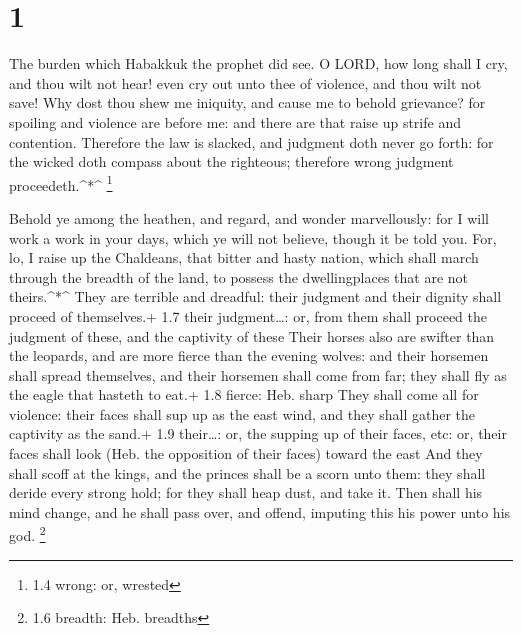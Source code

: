 \hypertarget{section}{%
\section{1}\label{section}}

 The burden which Habakkuk the prophet did see. 
O LORD, how long shall I cry, and thou wilt not hear! even cry out unto
thee of violence, and thou wilt not save!  Why dost thou
shew me iniquity, and cause me to behold grievance? for spoiling and
violence are before me: and there are that raise up strife and
contention.  Therefore the law is slacked, and judgment doth
never go forth: for the wicked doth compass about the righteous;
therefore wrong judgment proceedeth.\^{}*\^{} \footnote{1.4 wrong: or,
  wrested}

 Behold ye among the heathen, and regard, and wonder
marvellously: for I will work a work in your days, which ye will not
believe, though it be told you.  For, lo, I raise up the
Chaldeans, that bitter and hasty nation, which shall march through the
breadth of the land, to possess the dwellingplaces that are not
theirs.\^{}*\^{}  They are terrible and dreadful: their
judgment and their dignity shall proceed of themselves.+ 1.7 their
judgment\ldots: or, from them shall proceed the judgment of these, and
the captivity of these  Their horses also are swifter than
the leopards, and are more fierce than the evening wolves: and their
horsemen shall spread themselves, and their horsemen shall come from
far; they shall fly as the eagle that hasteth to eat.+ 1.8 fierce: Heb.
sharp  They shall come all for violence: their faces shall
sup up as the east wind, and they shall gather the captivity as the
sand.+ 1.9 their\ldots: or, the supping up of their faces, etc: or,
their faces shall look (Heb. the opposition of their faces) toward the
east  And they shall scoff at the kings, and the princes
shall be a scorn unto them: they shall deride every strong hold; for
they shall heap dust, and take it.  Then shall his mind
change, and he shall pass over, and offend, imputing this his power unto
his god. \footnote{1.6 breadth: Heb. breadths}


